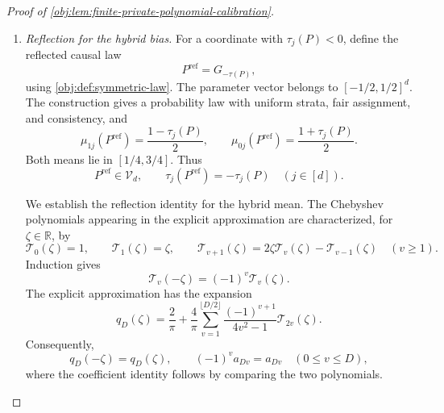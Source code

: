 \documentclass[11pt]{article}
\begin{document}
\begin{proof}[Proof of \cref{obj:lem:finite-private-polynomial-calibration}]
\begin{enumerate}
For \(y_j\ge1\), the inequality \(\log y_j\le y_j-1\) and the nonnegativity of \((y_j-1)^2\) imply
\[
\log y_j\le\frac{y_j^2}{2}.
\]
For every nonnegative integer \(v\le L/1024\), it follows that
\[
3v+v\log y_j
\le\frac72v y_j^2
\le\frac7{2048}Ly_j^2
\le Ly_j^2,
\]
so
\[
e^{-8Ly_j^2}e^{3v}y_j^v\le e^{-7Ly_j^2}.
\]
Applying this with \(v=D\) proves
\[
h_j|p_{a,D}(\tau_j(P))|
\le a e^{-8Ly_j^2}e^{3D}y_j^D
\le a e^{-7Ly_j^2}.
\]
Since \(1,2\le L/1024\), the same bound with \(v=1,2\) gives
\[
h_jy_j^v
\le e^{-8Ly_j^2}y_j^v
\le e^{-8Ly_j^2}e^{3v}y_j^v
\le e^{-7Ly_j^2}
\qquad(v=1,2).
\]
Thus
\[
h_j\tau_j(P)\le a e^{-7Ly_j^2},
\qquad
h_j\tau_j(P)^2\le a^2e^{-7Ly_j^2}.
\]

The exponential lower bound \(e^{7L}\ge1+7L\ge L\) implies
\[
e^{-7Ly_j^2}\le e^{-7L}\le\frac1L,
\qquad
\frac aL=\frac{8\sigma}{\sqrt L}.
\]
Using the hybrid mean identity and the wrong-sign bound consequently gives
\[
\begin{aligned}
|\mathbb EH_j-\tau_j(P)|
&\le h_j|p_{a,D}(\tau_j(P))|
      +h_j\tau_j(P)+2\tau_j(P)w_j\\
&\le(8+8+2)\frac{\sigma}{\sqrt L}
\le20000\,\frac{\sigma}{\sqrt L}.
\end{aligned}
\]
Together with the inside case, this proves the bias bound for every nonnegative contrast, including zero and the boundary \(\tau_j(P)=a\).

\item \textit{Reflection for the hybrid bias.}
For a coordinate with \(\tau_j(P)<0\), define the reflected causal law
\[
P^{\mathrm{ref}}=G_{-\tau(P)},
\]
using \cref{obj:def:symmetric-law}. The parameter vector belongs to \([-1/2,1/2]^d\). The construction gives a probability law with uniform strata, fair assignment, and consistency, and
\[
\mu_{1j}(P^{\mathrm{ref}})=\frac{1-\tau_j(P)}2,
\qquad
\mu_{0j}(P^{\mathrm{ref}})=\frac{1+\tau_j(P)}2.
\]
Both means lie in \([1/4,3/4]\). Thus
\[
P^{\mathrm{ref}}\in\mathcal V_d,
\qquad
\tau_j(P^{\mathrm{ref}})=-\tau_j(P)
\quad(j\in[d]).
\]

We establish the reflection identity for the hybrid mean. The Chebyshev polynomials appearing in the explicit approximation are characterized, for \(\zeta\in\mathbb R\), by
\[
\mathcal T_0(\zeta)=1,
\qquad
\mathcal T_1(\zeta)=\zeta,
\qquad
\mathcal T_{v+1}(\zeta)
=2\zeta\mathcal T_v(\zeta)-\mathcal T_{v-1}(\zeta)
\quad(v\ge1).
\]
Induction gives
\[
\mathcal T_v(-\zeta)=(-1)^v\mathcal T_v(\zeta).
\]
The explicit approximation has the expansion
\[
q_D(\zeta)
=\frac2\pi+\frac4\pi
 \sum_{v=1}^{\lfloor D/2\rfloor}
 \frac{(-1)^{v+1}}{4v^2-1}\mathcal T_{2v}(\zeta).
\]
Consequently,
\[
q_D(-\zeta)=q_D(\zeta),
\qquad
(-1)^v a_{Dv}=a_{Dv}\quad(0\le v\le D),
\]
where the coefficient identity follows by comparing the two polynomials.


\end{enumerate}
\end{proof}
\end{document}
